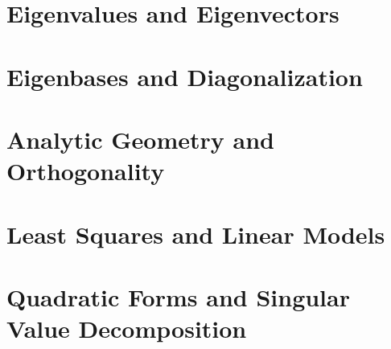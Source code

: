 \documentclass[10pt]{report}
\begin{document}
\chapter{Eigenvalues and Eigenvectors}


\chapter{Eigenbases and Diagonalization}


\chapter{Analytic Geometry and Orthogonality}


\chapter{Least Squares and Linear Models}


\chapter{Quadratic Forms and Singular Value Decomposition}

\end{document}
